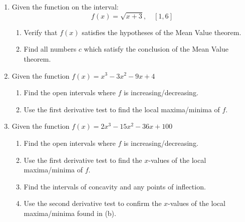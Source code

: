 \documentclass[12pt]{article}
\begin{document}
 
\begin{enumerate}
   \item Given the function on the interval:
$$f(x) = \sqrt{x+3}, \quad [1,6]$$
    \begin{enumerate}
        \item Verify that $f(x)$ satisfies the hypotheses of the Mean Value theorem.
        \vspace{3in}
        \item Find all numbers $c$ which satisfy the conclusion of the Mean Value theorem.
        \vfill
    \end{enumerate}
\pagebreak

    \item Given the function $f(x) = x^3-3x^2-9x+4$
\begin{enumerate}
    \item Find the open intervals where $f$ is increasing/decreasing.
    \vfill

    \item Use the first derivative test to find the local maxima/minima of $f$.
    \vfill
\end{enumerate}
\pagebreak
\item Given the function $f(x) = 2x^3-15x^2-36x+100$
\begin{enumerate}
    \item Find the open intervals where $f$ is increasing/decreasing.
    \vfill

    \item Use the first derivative test to find the $x$-values of the local maxima/minima of $f$.
    \vfill
\pagebreak

    \item Find the intervals of concavity and any points of inflection.
    \vfill

    \item Use the second derivative test to confirm the $x$-values of the local maxima/minima found in (b).
    \vfill
\end{enumerate}
\pagebreak
\end{enumerate}
\end{document}

